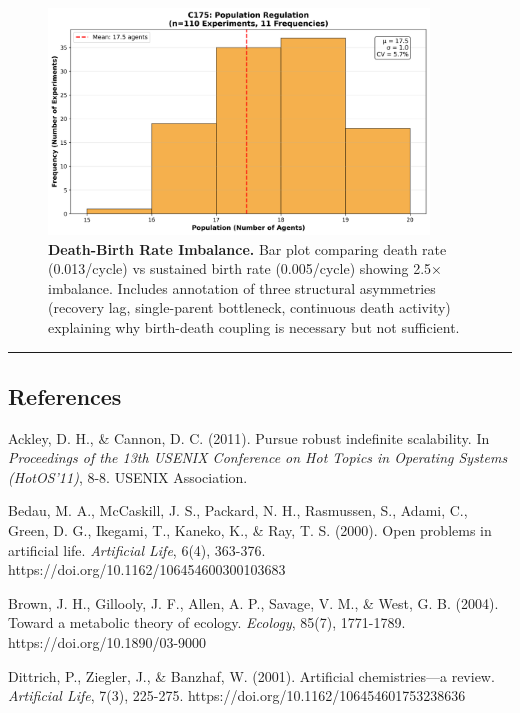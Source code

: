 \documentclass[
]{article}
\begin{document}
\begin{figure}[htbp]
\centering
\includegraphics[width=0.9\textwidth]{cycle175_population_distribution.png}
\caption{\textbf{Death-Birth Rate Imbalance.} Bar plot comparing death rate (0.013/cycle) vs sustained birth rate (0.005/cycle) showing 2.5× imbalance. Includes annotation of three structural asymmetries (recovery lag, single-parent bottleneck, continuous death activity) explaining why birth-death coupling is necessary but not sufficient.}
\label{fig:imbalance}
\end{figure}

\begin{center}\rule{0.5\linewidth}{0.5pt}\end{center}

\subsection{References}\label{references}

Ackley, D. H., \& Cannon, D. C. (2011). Pursue robust indefinite
scalability. In \emph{Proceedings of the 13th USENIX Conference on Hot
Topics in Operating Systems (HotOS'11)}, 8-8. USENIX Association.

Bedau, M. A., McCaskill, J. S., Packard, N. H., Rasmussen, S., Adami,
C., Green, D. G., Ikegami, T., Kaneko, K., \& Ray, T. S. (2000). Open
problems in artificial life. \emph{Artificial Life}, 6(4), 363-376.
https://doi.org/10.1162/106454600300103683

Brown, J. H., Gillooly, J. F., Allen, A. P., Savage, V. M., \& West, G.
B. (2004). Toward a metabolic theory of ecology. \emph{Ecology}, 85(7),
1771-1789. https://doi.org/10.1890/03-9000

Dittrich, P., Ziegler, J., \& Banzhaf, W. (2001). Artificial
chemistries---a review. \emph{Artificial Life}, 7(3), 225-275.
https://doi.org/10.1162/106454601753238636
\end{document}

